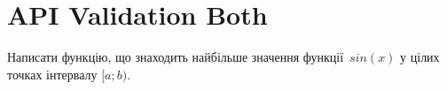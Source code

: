 \documentclass[12pt]{article}
\begin{document}
\section*{API Validation Both}

Написати функцію, що знаходить найбільше значення функції~$sin(x)$ у цілих точках інтервалу $[a; b)$.


\end{document}
